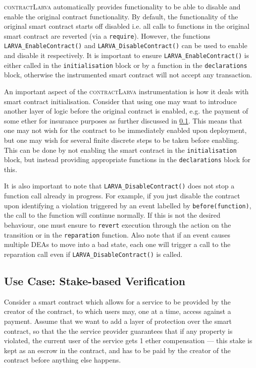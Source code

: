 \documentclass{article}
\newcommand{\contractlarva}{\textsc{contractLarva}\xspace}
\begin{document}
 \contractlarva automatically provides functionality to be able to disable and enable the original contract functionality. By default, the functionality of the original smart contract starts off disabled i.e. all calls to functions in the original smart contract are reverted (via a \texttt{require}). However, the functions \texttt{LARVA\_EnableContract()} and \texttt{LARVA\_DisableContract()} can be used to enable and disable it respectively. It is important to ensure \texttt{LARVA\_EnableContract()} is either called in the \texttt{initialisation} block or by a function in the \texttt{declarations} block, otherwise the instrumented smart contract will not accept any transaction.

  An important aspect of the \contractlarva instrumentation is how it deals with smart contract initialisation. Consider that using one may want to introduce another layer of logic before the original contract is enabled, e.g. the payment of some ether for insurance purposes as further discussed in \ref{s:example}. This means that one may not wish for the contract to be immediately enabled upon deployment, but one may wish for several finite discrete steps to be taken before enabling. This can be done by not enabling the smart contract in the \texttt{initialisation} block, but instead providing appropriate functions in the \texttt{declarations} block for this.
  
  It is also important to note that \texttt{LARVA\_DisableContract()} does not stop a function call already in progress. For example, if you just disable the contract upon identifying a violation triggered by an event labelled by \texttt{before(function)}, the call to the function will continue normally. If this is not the desired behaviour, one must ensure to \texttt{revert} execution through the action on the transition or in the \texttt{reparation} function. Also note that if an event causes multiple DEAs to move into a bad state, each one will trigger a call to the reparation call even if \texttt{LARVA\_DisableContract()} is called.

  \subsection{Use Case: Stake-based Verification}
  \label{s:example}

  Consider a smart contract which allows for a service to be provided by the creator of the contract, to which users may, one at a time, access against a payment. Assume that we want to add a layer of protection over the smart contract, so that the the service provider guarantees that if any property is violated, the current user of the service gets 1 ether compensation --- this stake is kept as an escrow in the contract, and has to be paid by the creator of the contract before anything else happens. 
  
\end{document}

